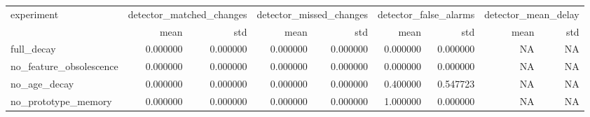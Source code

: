\begin{tabular}{lrrrrrrrr}
\toprule
experiment & \multicolumn{2}{r}{detector\_matched\_changes} & \multicolumn{2}{r}{detector\_missed\_changes} & \multicolumn{2}{r}{detector\_false\_alarms} & \multicolumn{2}{r}{detector\_mean\_delay} \\
 & mean & std & mean & std & mean & std & mean & std \\
\midrule
full\_decay & 0.000000 & 0.000000 & 0.000000 & 0.000000 & 0.000000 & 0.000000 & NA & NA \\
no\_feature\_obsolescence & 0.000000 & 0.000000 & 0.000000 & 0.000000 & 0.000000 & 0.000000 & NA & NA \\
no\_age\_decay & 0.000000 & 0.000000 & 0.000000 & 0.000000 & 0.400000 & 0.547723 & NA & NA \\
no\_prototype\_memory & 0.000000 & 0.000000 & 0.000000 & 0.000000 & 1.000000 & 0.000000 & NA & NA \\
\bottomrule
\end{tabular}
